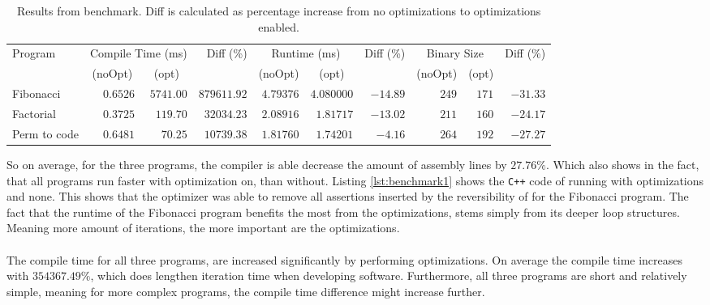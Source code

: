 \begin{table}[H]
    \centering
    \begin{tabular}{|l||r|r|r||r|r|r||r|r|r|}
        \hline
        \multirow{2}{*}{Program}& \multicolumn{2}{c|}{Compile Time (ms)} & \multirow{2}{*}{Diff (\%)} & \multicolumn{2}{c|}{Runtime (ms)} & \multirow{2}{*}{Diff (\%)} & \multicolumn{2}{c|}{Binary Size} & \multirow{2}{*}{Diff (\%)} \\
        \cline{2-3} \cline{5-6} \cline{8-9}
        & \multicolumn{1}{c|}{(noOpt)} & \multicolumn{1}{c|}{(opt)} & & \multicolumn{1}{c|}{(noOpt)} & \multicolumn{1}{c|}{(opt)} & & \multicolumn{1}{c|}{(noOpt)} & \multicolumn{1}{c|}{(opt)} &  \\
        \hline
        Fibonacci    & $0.6526$ & $5741.00$ & $879611.92$ & $4.79376$ & $4.080000$ & $-14.89$ & $249$ & $171$ & $-31.33$ \\
        \hline
        Factorial    & $0.3725$ & $119.70$  & $32034.23$  & $2.08916$ & $1.81717$  & $-13.02$   & $211$ & $160$ & $-24.17$ \\
        \hline
        Perm to code & $0.6481$ & $70.25$   & $10739.38$  & $1.81760$ & $1.74201$  & $-4.16$  & $264$ & $192$ & $-27.27$ \\
        \hline
    \end{tabular}
    \caption{Results from benchmark. Diff is calculated as percentage increase from no optimizations
    to optimizations enabled.}
    \label{table:benchmark-results}
\end{table}
\noindent
So on average, for the three programs, the \lan compiler is able decrease the amount of
assembly lines by $27.76\%$. Which also shows in the fact, that all programs run faster with
optimization on, than without. Listing \ref{lst:benchmark1} shows the \texttt{C++} code of
running with optimizations and none. This shows that the optimizer was able to remove all
assertions inserted by the reversibility of \lan for the Fibonacci program. The fact that
the runtime of the Fibonacci program benefits the most from the optimizations, stems simply
from its deeper loop structures. Meaning more amount of iterations, the more important are
the optimizations.
\\
\\
The compile time for all three programs, are increased significantly by performing optimizations.
On average the compile time increases with $354367.49\%$, which does lengthen iteration time
when developing software. Furthermore, all three programs are short and relatively simple,
meaning for more complex programs, the compile time difference might increase further.
